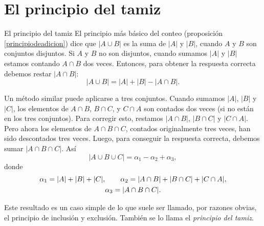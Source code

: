 

\appendix
\setcounter{chapter}{1}
\renewcommand{\thechapter}{\Alph{chapter}}
\chapter[El principio del tamiz]{El principio del tamiz} \label{principiodeltamiz}





\begin{section}{El principio del tamiz}\label{Ap1.2}
El principio más básico del conteo (proposición \ref{principiodeadicion}) dice que $|A \cup B|$ es la suma de $|A|$ y $|B|$, cuando $A$ y $B$ son conjuntos
disjuntos. Si $A$ y $B$ no son disjuntos, cuando sumamos $|A|$ y $|B|$ estamos contando $A \cap B$ dos veces. Entonces, para obtener la respuesta correcta debemos restar $|A \cap B|$:
$$
|A \cup B| = |A|+|B| - |A \cap B|.
$$

Un método similar puede aplicarse a tres conjuntos. Cuando sumamos $|A|$, $|B|$ y $|C|$, los elementos de $A \cap B$, $B \cap C$, y $C \cap A$ son contados dos veces (si no están en los tres
conjuntos). Para corregir esto, restamos $|A \cap B|$, $|B \cap C|$ y $|C \cap A|$. Pero ahora los elementos de $A \cap B \cap C$, contados originalmente tres veces, han sido descontados tres
veces. Luego, para conseguir la respuesta correcta, debemos sumar $|A \cap B \cap C|$. Así
$$
|A \cup B\cup C|= \alpha_1-\alpha_2+\alpha_3,
$$ 
donde
$$\gathered
\alpha_1=|A|+|B|+|C|,\qquad \alpha_2= |A \cap B|+|B \cap C|+|C \cap A|, \\
\alpha_3 = |A \cap B \cap C|.
\endgathered
$$




Este resultado es un caso simple de lo que suele ser llamado, por razones obvias, el principio de inclusión y exclusión. También
 se lo llama el { \it principio del tamiz}.  




\end{section}

